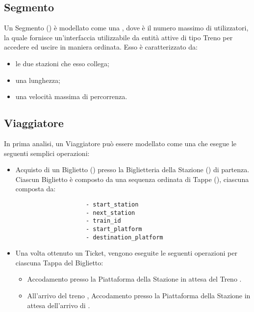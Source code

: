 	\subsection{Segmento}
	
	Un Segmento () è modellato come una , dove  è il numero massimo di utilizzatori, la quale fornisce un'interfaccia utilizzabile da entità attive di tipo Treno per accedere ed uscire in maniera ordinata. Esso è caratterizzato da:
			\begin{itemize}
				\item le due stazioni che esso collega;
				\item una lunghezza;
				\item una velocità massima di percorrenza.
			\end{itemize}


	\subsection{Viaggiatore}			
	
	In prima analisi, un Viaggiatore  può essere modellato come una  che esegue le seguenti semplici operazioni:
		\begin{itemize}
			\item Acquisto di un Biglietto () presso la Biglietteria della Stazione () di partenza. Ciascun Biglietto è composto da una sequenza ordinata di Tappe (), ciascuna composta da:
				\begin{verbatim}
					- start_station
					- next_station
					- train_id 
					- start_platform 
					- destination_platform
				\end{verbatim}
			\item Una volta ottenuto un Ticket, vengono eseguite le seguenti operazioni per ciascuna Tappa del Biglietto:
				\begin{itemize}
					\item Accodamento presso la Piattaforma  della Stazione  in attesa del Treno .
					\item All'arrivo del treno , Accodamento presso la Piattaforma  della Stazione  in attesa dell'arrivo di . 
				\end{itemize}
		\end{itemize} 
	
